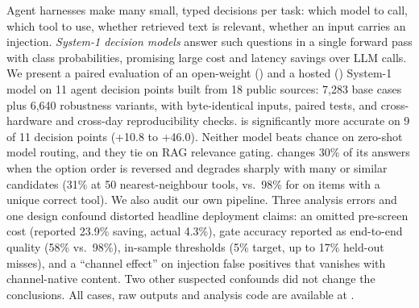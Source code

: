 Agent harnesses make many small, typed decisions per task: which model to call, which tool to use, whether retrieved text is relevant, whether an input carries an injection. \emph{System-1 decision models} answer such questions in a single forward pass with class probabilities, promising large cost and latency savings over LLM calls. We present a paired evaluation of an open-weight (\laya{}) and a hosted (\jev{}) System-1 model on 11 agent decision points built from 18 public sources: 7,283 base cases plus 6,640 robustness variants, with byte-identical inputs, paired tests, and cross-hardware and cross-day reproducibility checks. \jev{} is significantly more accurate on 9 of 11 decision points (+10.8 to +46.0\pp). Neither model beats chance on zero-shot model routing, and they tie on RAG relevance gating. \laya{} changes 30\% of its answers when the option order is reversed and degrades sharply with many or similar candidates (31\% at 50 nearest-neighbour tools, vs.\ 98\% for \jev{} on items with a unique correct tool). We also audit our own pipeline. Three analysis errors and one design confound distorted headline deployment claims: an omitted pre-screen cost (reported 23.9\% saving, actual 4.3\%), gate accuracy reported as end-to-end quality (58\% vs.\ 98\%), in-sample thresholds (5\% target, up to 17\% held-out misses), and a ``channel effect'' on injection false positives that vanishes with channel-native content. Two other suspected confounds did not change the conclusions. All cases, raw outputs and analysis code are available at \codeurl{}.
